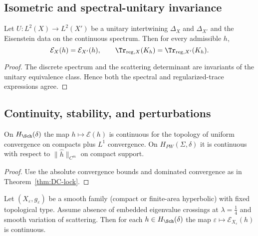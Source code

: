 \subsection{Isometric and spectral-unitary invariance}
\label{subsec:part3-invariance}

\begin{proposition}[Invariance]
\label{prop:invariance}
Let $U:L^2(X)\to L^2(X')$ be a unitary intertwining $\Delta_X$ and $\Delta_{X'}$ and the Eisenstein data
on the continuous spectrum. Then for every admissible $h$,
\[
  \mathcal{E}_X(h) = \mathcal{E}_{X'}(h),\qquad
  \Tr_{\mathrm{reg},X}(K_h) = \Tr_{\mathrm{reg},X'}(K_h).
\]
\end{proposition}

\begin{proof}
The discrete spectrum and the scattering determinant are invariants of the unitary equivalence class. Hence both the spectral and regularized-trace expressions agree.
\end{proof}

\subsection{Continuity, stability, and perturbations}
\label{subsec:part3-stability}

\begin{proposition}[Continuity in $h$]
\label{prop:continuity-h}
On $H_{\Sch}(\delta)$ the map $h\mapsto \mathcal{E}(h)$ is continuous for the topology of uniform convergence on compacts plus $L^1$ convergence. On $H_{PW}(\Sigma,\delta)$ it is continuous with respect to $\|\widehat h\|_{C^m}$ on compact support.
\end{proposition}

\begin{proof}
Use the absolute convergence bounds and dominated convergence as in Theorem~\ref{thm:DC-lock}.
\end{proof}

\begin{proposition}
\label{prop:stability-geom}
Let $(X_\varepsilon,g_\varepsilon)$ be a smooth family (compact or finite-area hyperbolic) with fixed topological type. Assume absence of embedded eigenvalue crossings at $\lambda=\frac14$ and smooth variation of scattering. Then for each $h\in H_{\Sch}(\delta)$ the map $\varepsilon\mapsto \mathcal{E}_{X_\varepsilon}(h)$ is continuous.
\end{proposition}

